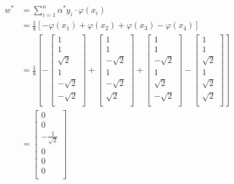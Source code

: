 	\begin{align*}
	w^* &= \sum_{i=1}^{n} \alpha^* y_i \cdot \varphi (x_i) \\
	    &= \frac{1}{8} \left[ -\varphi(x_1) + \varphi(x_2) + \varphi(x_3) - \varphi(x_4) \right] \\
	    &= \frac{1}{8} \left[
	    - \begin{bmatrix}
	    1 \\
	    1 \\
	    \sqrt{2} \\
	    1 \\
	    -\sqrt{2} \\
	    -\sqrt{2} \\
	    \end{bmatrix}
	    + \begin{bmatrix}
	    1 \\
	    1 \\
	    -\sqrt{2} \\
	    1 \\
	    -\sqrt{2} \\
	    \sqrt{2} \\
	    \end{bmatrix}
	    + \begin{bmatrix}
	    1 \\
	    1 \\
	    -\sqrt{2} \\
	    1 \\
	    \sqrt{2} \\
	    -\sqrt{2} \\
	    \end{bmatrix}
	    - \begin{bmatrix}
	    1 \\
	    1 \\
	    \sqrt{2} \\
	    1 \\
	    \sqrt{2} \\
	    \sqrt{2} \\
	    \end{bmatrix}
	    \right] \\
	    &= \begin{bmatrix}
	    0 \\
	    0 \\
	    -\frac{1}{\sqrt{2}} \\
	    0 \\
	    0 \\
	    0 \\
	    \end{bmatrix}
	\end{align*}

